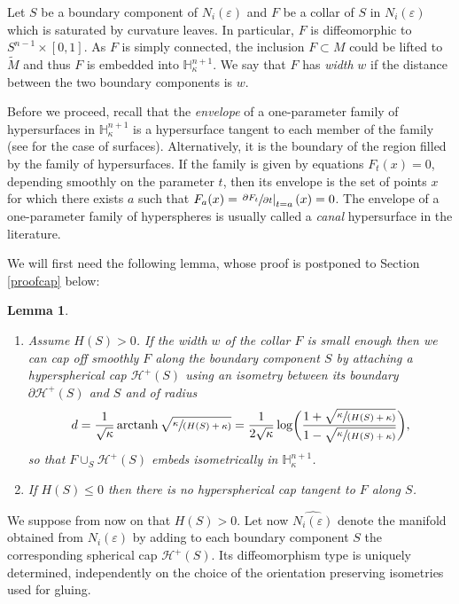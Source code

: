 \documentclass[10pt]{amsart}
\let\mathcal\mathscr
\DeclareMathOperator{\arctanh}{arctanh}
\newcommand{\spfrac}[2]{\sfrac{#1}{(#2)}}
\newtheorem{lemma}[theorem]{Lemma}
\theoremstyle{definition}
\theoremstyle{remark}
\numberwithin{equation}{section}
\providecommand{\skpt}{\par\smallskip\noindent}
\begin{document}
Let $S$ be a boundary component of $N_i(\varepsilon)$ and
$F$ be a collar of $S$ in $N_i(\varepsilon)$ which is saturated by
curvature leaves. In particular, $F$ is diffeomorphic to
$S^{n-1}\times [0,1]$. As $F$ is simply connected, the inclusion $F\subset M$ could be lifted
to $\widetilde{M}$ and thus $F$ is embedded into $\mathbb H_{\kappa}^{n+1}$.
We say that $F$ has \emph{width} $w$ if the distance between the
two boundary components is $w$.

Before we proceed, recall that the \emph{envelope} of a one-parameter family of hypersurfaces in
$\mathbb H_{\kappa}^{n+1}$ is a hypersurface tangent to each member of the family (see \cite{Ei} for the case of surfaces).
Alternatively, it is the boundary of the region filled by the family of hypersurfaces. If the family is given by
equations $F_t(x)=0$, depending smoothly on the parameter $t$, then its envelope is the set of points $x$
for which there exists $a$ such that $F_a(x)=\left.\sfrac{\partial F_t}{\partial t}\right|_{t=a}(x)=0$.
The envelope of a one-parameter family of hyperspheres is usually called a \emph{canal} hypersurface in the literature.

We will first need the following lemma, whose proof is postponed to Section \ref{proofcap} below:

\skpt
\begin{lemma}\label{cap}
\begin{enumerate}
\item Assume $H(S) >0$. If the width $w$ of the collar $F$ is
small enough then we can cap off smoothly $F$ along the boundary component
$S$ by attaching a hyperspherical cap $\mathcal H^+(S)$ using an isometry between its boundary
$\partial \mathcal H^+(S)$ and $S$ and
of radius
\[d=\frac{1}{\sqrt{\kappa}}\arctanh \sqrt{\spfrac{\kappa}{H(S)+\kappa}}=
\frac{1}{2\sqrt{\kappa}}\log\biggl(\frac{1+\sqrt{\spfrac{\kappa}{H(S)+\kappa}} }{1-\sqrt{\spfrac{\kappa}{H(S)+\kappa}}}\biggr),\]
so that $F\cup_S \mathcal H^+(S)$ embeds isometrically
in $\mathbb H_{\kappa}^{n+1}$.
\item If $H(S) \leq 0$ then there is no hyperspherical cap tangent to $F$ along $S$.
\end{enumerate}
\end{lemma}

We suppose from now on that $H(S)>0$.
Let now $\widehat{N_i(\varepsilon)}$ denote the manifold obtained
from $N_i(\varepsilon)$ by adding to each boundary component $S$
the corresponding spherical cap $\mathcal H^+(S)$. Its diffeomorphism type is uniquely determined, independently on the
choice of the orientation preserving isometries used for gluing.
\end{document}
